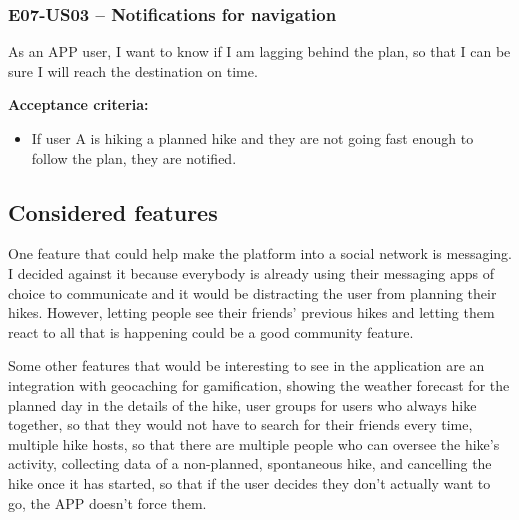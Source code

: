 \subsubsection*{E07-US03 -- Notifications for navigation}
As an APP user, I want to know if I am lagging behind the plan, so that I can be sure I will reach the destination on time.

\textbf{Acceptance criteria:}
\begin{itemize}
    \item If user A is hiking a planned hike and they are not going fast enough to follow the plan, they are notified.
\end{itemize}


\subsection*{Considered features}
One feature that could help make the platform into a social network is messaging.
I decided against it because everybody is already using their messaging apps of choice to communicate and it would be distracting the user from planning their hikes.
However, letting people see their friends' previous hikes and letting them react to all that is happening could be a good community feature.

Some other features that would be interesting to see in the application are an integration with geocaching\cite{geocaching} for gamification,
showing the weather forecast for the planned day in the details of the hike,
user groups for users who always hike together, so that they would not have to search for their friends every time,
multiple hike hosts, so that there are multiple people who can oversee the hike's activity,
collecting data of a non-planned, spontaneous hike,
and cancelling the hike once it has started, so that if the user decides they don't actually want to go, the APP doesn't force them.
